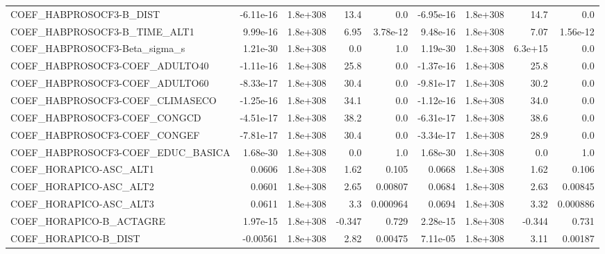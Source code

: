 \begin{tabular}{lrrrrrrrr}
COEF\_HABPROSOCF3-B\_DIST           &   -6.11e-16 &     1.8e+308 &      13.4 &      0.0 &  -6.95e-16 &    1.8e+308 &         14.7 &           0.0 \\
COEF\_HABPROSOCF3-B\_TIME\_ALT1      &    9.99e-16 &     1.8e+308 &      6.95 & 3.78e-12 &   9.48e-16 &    1.8e+308 &         7.07 &      1.56e-12 \\
COEF\_HABPROSOCF3-Beta\_sigma\_s     &    1.21e-30 &     1.8e+308 &       0.0 &      1.0 &   1.19e-30 &    1.8e+308 &      6.3e+15 &           0.0 \\
COEF\_HABPROSOCF3-COEF\_ADULTO40    &   -1.11e-16 &     1.8e+308 &      25.8 &      0.0 &  -1.37e-16 &    1.8e+308 &         25.8 &           0.0 \\
COEF\_HABPROSOCF3-COEF\_ADULTO60    &   -8.33e-17 &     1.8e+308 &      30.4 &      0.0 &  -9.81e-17 &    1.8e+308 &         30.2 &           0.0 \\
COEF\_HABPROSOCF3-COEF\_CLIMASECO   &   -1.25e-16 &     1.8e+308 &      34.1 &      0.0 &  -1.12e-16 &    1.8e+308 &         34.0 &           0.0 \\
COEF\_HABPROSOCF3-COEF\_CONGCD      &   -4.51e-17 &     1.8e+308 &      38.2 &      0.0 &  -6.31e-17 &    1.8e+308 &         38.6 &           0.0 \\
COEF\_HABPROSOCF3-COEF\_CONGEF      &   -7.81e-17 &     1.8e+308 &      30.4 &      0.0 &  -3.34e-17 &    1.8e+308 &         28.9 &           0.0 \\
COEF\_HABPROSOCF3-COEF\_EDUC\_BASICA &    1.68e-30 &     1.8e+308 &       0.0 &      1.0 &   1.68e-30 &    1.8e+308 &          0.0 &           1.0 \\
COEF\_HORAPICO-ASC\_ALT1            &      0.0606 &     1.8e+308 &      1.62 &    0.105 &     0.0668 &    1.8e+308 &         1.62 &         0.106 \\
COEF\_HORAPICO-ASC\_ALT2            &      0.0601 &     1.8e+308 &      2.65 &  0.00807 &     0.0684 &    1.8e+308 &         2.63 &       0.00845 \\
COEF\_HORAPICO-ASC\_ALT3            &      0.0611 &     1.8e+308 &       3.3 & 0.000964 &     0.0694 &    1.8e+308 &         3.32 &      0.000886 \\
COEF\_HORAPICO-B\_ACTAGRE           &    1.97e-15 &     1.8e+308 &    -0.347 &    0.729 &   2.28e-15 &    1.8e+308 &       -0.344 &         0.731 \\
COEF\_HORAPICO-B\_DIST              &    -0.00561 &     1.8e+308 &      2.82 &  0.00475 &   7.11e-05 &    1.8e+308 &         3.11 &       0.00187 \\

\end{tabular}
